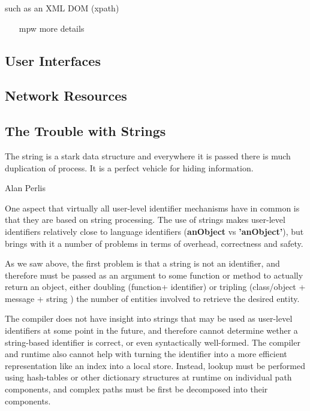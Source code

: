 \documentclass[preprint,authoryear]{acm_proc_article-sp}
\begin{document}
 such as an XML DOM (xpath)

\begin{itemize}
\item [mpw] more details
\end{itemize}

\subsection{User Interfaces}




\subsection{Network Resources}



\subsection{The Trouble with Strings}
\label{stringtrouble}
\epigraph{The string is a stark data structure and everywhere it is passed there is much duplication of process. It is a perfect vehicle for hiding information.}{Alan Perlis}


One aspect that virtually all user-level identifier mechanisms have in common is that they
are based on string processing.  The use of strings makes user-level identifiers relatively
close to language identifiers ({\bf \hbox{anObject}} vs {\bf \hbox{'anObject'}}), but brings with it a number of problems in terms of overhead, correctness and safety.

As we saw above, the first problem is that a string is not an identifier, and therefore
must be passed as an argument to some function or method to actually return
 an object, either doubling (function+
identifier) or tripling (class/object + message + string ) the number of entities involved to 
retrieve the desired entity.  

The compiler does not have insight into strings that may be used as user-level 
identifiers at some point in the future, and therefore cannot determine wether 
a string-based identifier is correct, or even syntactically well-formed.   The compiler
and runtime also cannot help with turning the identifier into a more efficient representation
like an index into a local store.  Instead, lookup must be performed using hash-tables
or other dictionary structures at runtime on individual path components, 
and complex paths must be first be decomposed into their components.
\end{document}
